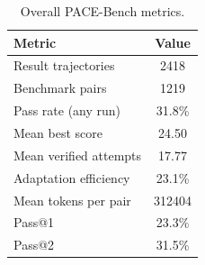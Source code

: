 \begin{table}[t]
    \centering
    \caption{Overall PACE-Bench metrics.}
    \label{tab:pace_overall_metrics}
    \begin{tabular}{lc}
        \toprule
        \textbf{Metric} & \textbf{Value} \\
        \midrule
        Result trajectories & 2418 \\
        Benchmark pairs & 1219 \\
        Pass rate (any run) & 31.8\% \\
        Mean best score & 24.50 \\
        Mean verified attempts & 17.77 \\
        Adaptation efficiency & 23.1\% \\
        Mean tokens per pair & 312404 \\
        Pass@1 & 23.3\% \\
        Pass@2 & 31.5\% \\
        \bottomrule
    \end{tabular}
\end{table}
